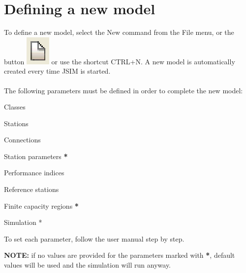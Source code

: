 \section{Defining a new model}
\label{sec:DefiningANewModel}
To define a new model, select the New command from the File menu, or the button \includegraphics[scale=.5]{img/jsim/new.eps} or use the shortcut CTRL+N. A new model is automatically created every time JSIM is started.\\\\
The following parameters must be defined in order to complete the new model:
\begin{itemize*}
\item Classes
\item Stations
\item Connections
\item Station parameters \textbf{*}
\item Performance indices
\item Reference stations
\item Finite capacity regions \textbf{*}
\item Simulation *
\end{itemize*}
To set each parameter, follow the user manual step by step.

\noindent \textbf{NOTE:} if no values are provided for the parameters marked with \textbf{*}, default values will be used and the simulation will run anyway.

